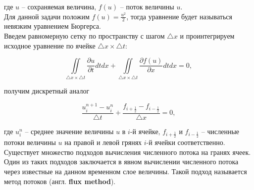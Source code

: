 \documentclass[12pt,a4paper]{article}
\begin{document}
        \begin{center}
        \end{center}

		где $u$ -- сохраняемая величина, $f \left( u \right)$ -- поток величины $u$.\\
		
		Для данной задачи положим $f \left( u \right) = \frac{u^{2}}{2}$, тогда уравнение будет называться невязким уравнением Бюргерса.\\

		Введем равномерную сетку по пространству с шагом $\triangle x$ и проинтегрируем исходное уравнение по ячейке $\triangle x \times \triangle t$:

		\begin{equation}
			\iint\limits_{\triangle x \times \triangle t} \frac{\partial u}{\partial t} dt dx + \iint\limits_{\triangle x \times \triangle t} \frac{\partial f \left( u \right)}{\partial x} dt dx = 0,
		\end{equation}

		получим дискретный аналог
		
		\begin{equation}
			\frac{u^{n+1}_{i} - u^{n}_{i}}{\triangle t} + \frac{f_{i+\frac{1}{2}} - f_{i-\frac{1}{2}}}{\triangle x} = 0,
		\end{equation}

		где $u^{n}_{i}$ -- среднее значение величины $u$ в $i$-й ячейке, $f_{i+\frac{1}{2}}$ и $f_{i-\frac{1}{2}}$ -- численные потоки величины $u$ на правой и левой грянях $i$-й ячейки соответственно.\\

		Существует множество подходов вычисления численного потока на гранях ячеек. Один из таких подходов заключается в явном вычислении численного потока через известные на данном временном слое величины. Такой подход называется метод потоков (англ. \textbf{flux method}).\\
\end{document}
